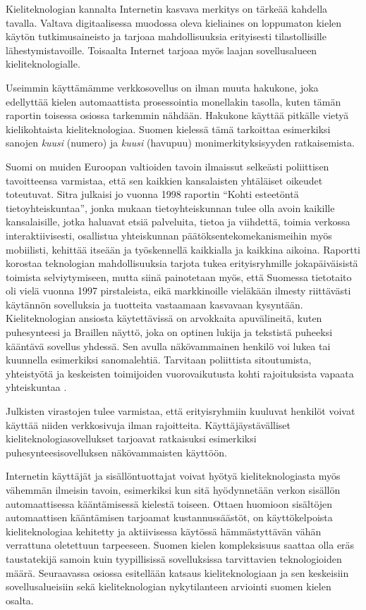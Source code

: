 \begin{multicols}{2}
Kieliteknologian kannalta Internetin kasvava merkitys on tärkeää kahdella tavalla. Valtava digitaalisessa muodossa oleva kieliaines on loppumaton kielen käytön tutkimusaineisto ja tarjoaa mahdollisuuksia erityisesti tilastollisille lähestymistavoille. Toisaalta Internet tarjoaa myös laajan sovellusalueen kieliteknologialle.


Useimmin käyttämämme verkkosovellus on ilman muuta hakukone, joka edellyttää kielen automaattista prosessointia monellakin tasolla, kuten tämän raportin toisessa osiossa tarkemmin nähdään. Hakukone käyttää pitkälle vietyä kielikohtaista kieliteknologiaa. Suomen kielessä tämä tarkoittaa esimerkiksi sanojen \textit{kuusi} (numero) ja \textit{kuusi} (havupuu) monimerkityksisyyden ratkaisemista.

Suomi on muiden Euroopan valtioiden tavoin ilmaissut selkeästi poliittisen tavoitteensa varmistaa, että sen kaikkien kansalaisten yhtäläiset oikeudet toteutuvat. Sitra julkaisi jo vuonna 1998 raportin ``Kohti esteetöntä tietoyhteiskuntaa'', jonka mukaan tietoyhteiskunnan tulee olla avoin kaikille kansalaisille, jotka haluavat etsiä palveluita, tietoa ja viihdettä, toimia verkossa interaktiivisesti, osallistua yhteiskunnan päätöksentekomekanismeihin myös mobiilisti, kehittää itseään ja työskennellä kaikkialla ja kaikkina aikoina. Raportti korostaa teknologian mahdollisuuksia tarjota tukea erityisryhmille jokapäiväisistä toimista selviytymiseen, mutta siinä painotetaan myös, että Suomessa tietotaito oli vielä vuonna 1997 pirstaleista, eikä markkinoille vieläkään ilmesty riittävästi käytännön sovelluksia ja tuotteita vastaamaan kasvavaan kysyntään. Kieliteknologian ansiosta käytettävissä on arvokkaita apuvälineitä, kuten puhesynteesi ja Braillen näyttö, joka on optinen lukija ja tekstistä puheeksi kääntävä sovellus yhdessä.  Sen avulla näkövammainen henkilö voi lukea tai kuunnella esimerkiksi sanomalehtiä.  Tarvitaan poliittista sitoutumista, yhteistyötä ja keskeisten toimijoiden vuorovaikutusta kohti rajoituksista vapaata yhteiskuntaa \cite{Sitra1998}.

Julkisten virastojen tulee varmistaa, että erityisryhmiin kuuluvat henkilöt voivat käyttää niiden verkkosivuja ilman rajoitteita. Käyttäjäystävälliset kieliteknologiasovellukset tarjoavat ratkaisuksi esimerkiksi puhesynteesisovelluksen näkövammaisten käyttöön.

Internetin käyttäjät ja sisällöntuottajat voivat hyötyä kieliteknologiasta myös vähemmän ilmeisin tavoin, esimerkiksi kun sitä hyödynnetään verkon sisällön automaattisessa kääntämisessä kielestä toiseen. Ottaen huomioon sisältöjen automaattisen kääntämisen tarjoamat kustannussäästöt, on käyttökelpoista kieliteknologiaa kehitetty ja aktiivisessa käytössä hämmästyttävän vähän verrattuna oletettuun tarpeeseen. Suomen kielen kompleksisuus saattaa olla eräs taustatekijä samoin kuin tyypillisissä sovelluksissa tarvittavien teknologioiden määrä. Seuraavassa osiossa esitellään katsaus kieliteknologiaan ja sen keskeisiin sovellusalueisiin sekä kieliteknologian nykytilanteen arviointi suomen kielen osalta.
\end{multicols}

